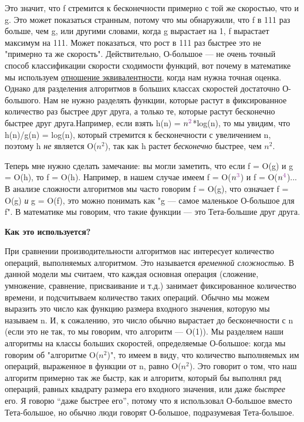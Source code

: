 \vspace{\baselineskip}
Это значит, что f стремится к бесконечности примерно с той же скоростью, что и g. Это может показаться странным, потому что мы обнаружили, что f в 111 раз больше, чем g, или другими словами, когда g вырастает на 1, f вырастает максимум на 111. Может показаться, что рост в 111 раз быстрее это не "примерно та же скорость". Действительно, О-большое --- не очень точный способ классификации скорости сходимости функций, вот почему в математике мы используем \href{https://en.wikipedia.org/wiki/Asymptotic_analysis}{\underline{отношение эквивалентности}}, когда нам нужна точная оценка. Однако для разделения алгоритмов в больших классах скоростей достаточно О-большого. Нам не нужно разделять функции, которые растут в фиксированное количество раз быстрее друг друга, а только те, которые растут бесконечно быстрее друг друга.Например, если взять h(n) = $n^{\p{2}}$*log(n), то мы увидим, что h(n)/g(n) = log(n), который стремится к бесконечности с увеличением n, поэтому h \textit{не} является O($n^{2}$), так как h растет \textit{бесконечно} быстрее, чем $n^{2}$.

\vspace{\baselineskip}
Теперь мне нужно сделать замечание: вы могли заметить, что если f = O(g) и g = O(h), то f = O(h). Например, в нашем случае имеем f = O($n^{\p{3}}$) и f = O($n^{\p{4}}$)... В анализе сложности алгоритмов мы часто говорим f = O(g), что означает f = O(g) \textit{и} g = O(f), это можно понимать как "g --- самое маленькое О-большое для f". В математике мы говорим, что такие функции --- это Тета-большие друг друга.

\newpage
\textbf{Как это используется?}

\vspace{\baselineskip}
При сравнении производительности алгоритмов нас интересует количество операций, выполняемых алгоритмом. Это называется \textit{временной сложностью}. В данной модели мы считаем, что каждая основная операция (сложение, умножение, сравнение, присваивание и т.д.) занимает фиксированное количество времени, и подсчитываем количество таких операций. Обычно мы можем выразить это число как функцию размера входного значения, которую мы называем n. И, к сожалению, это число обычно вырастает до бесконечности с n (если это не так, то мы говорим, что алгоритм --- O(1)). Мы разделяем наши алгоритмы на классы больших скоростей, определяемые О-большое: когда мы говорим об "алгоритме O($n^{2}$)", то имеем в виду, что количество выполняемых им операций, выраженное в функции от n, равно O($n^{2}$). Это говорит о том, что наш алгоритм примерно так же быстр, как и алгоритм, который бы выполнял ряд операций, равных квадрату размера его входного значения, или даже \textit{быстрее} его. Я говорю “даже быстрее его”, потому что я использовал О-большое вместо Тета-большое, но обычно люди говорят О-большое, подразумевая Тета-большое.

